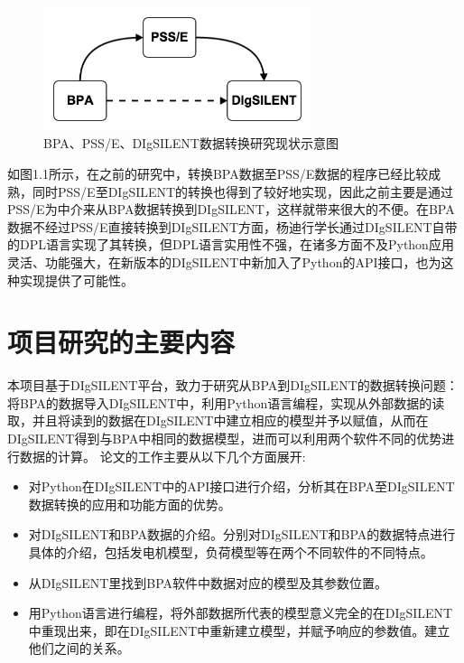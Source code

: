 \begin{figure}[h]
\centering
\includegraphics[width=0.7\textwidth]{images/Paper_Fig_11.png}
\setcaptionwidth{\linewidth}
\caption{BPA、PSS/E、DIgSILENT数据转换研究现状示意图}
\end{figure}

如图1.1所示，在之前的研究中，转换BPA数据至PSS/E数据的程序已经比较成熟，同时PSS/E至DIgSILENT的转换也得到了较好地实现，因此之前主要是通过PSS/E为中介来从BPA数据转换到DIgSILENT，这样就带来很大的不便。在BPA数据不经过PSS/E直接转换到DIgSILENT方面，杨迪行学长通过DIgSILENT自带的DPL语言实现了其转换，但DPL语言实用性不强，在诸多方面不及Python应用灵活、功能强大，在新版本的DIgSILENT中新加入了Python的API接口，也为这种实现提供了可能性。

\section{项目研究的主要内容}

本项目基于DIgSILENT平台，致力于研究从BPA到DIgSILENT的数据转换问题：将BPA的数据导入DIgSILENT中，利用Python语言编程，实现从外部数据的读取，并且将读到的数据在DIgSILENT中建立相应的模型并予以赋值，从而在DIgSILENT得到与BPA中相同的数据模型，进而可以利用两个软件不同的优势进行数据的计算。
论文的工作主要从以下几个方面展开:
\begin{itemize}
\item 对Python在DIgSILENT中的API接口进行介绍，分析其在BPA至DIgSILENT数据转换的应用和功能方面的优势。
\item 对DIgSILENT和BPA数据的介绍。分别对DIgSILENT和BPA的数据特点进行具体的介绍，包括发电机模型，负荷模型等在两个不同软件的不同特点。
\item 从DIgSILENT里找到BPA软件中数据对应的模型及其参数位置。
\item 用Python语言进行编程，将外部数据所代表的模型意义完全的在DIgSILENT中重现出来，即在DIgSILENT中重新建立模型，并赋予响应的参数值。建立他们之间的关系。
\end{itemize}

